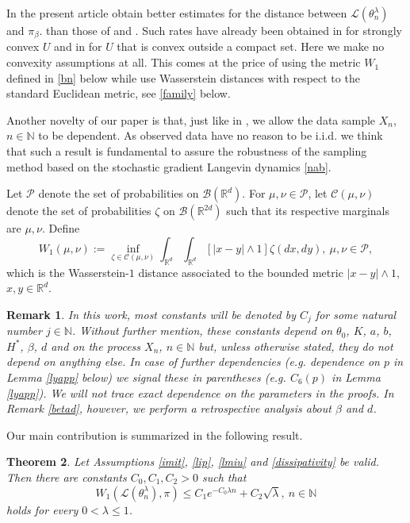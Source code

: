 \documentclass[a4paper,draft]{article}
\newtheorem{theorem}{Theorem}[section]
\newtheorem{remark}[theorem]{Remark}
\begin{document}
In the present article obtain better estimates for 
the distance between $\mathcal{L}(\theta^{\lambda}_n)$ and $\pi_{\beta}$.
than those of \cite{raginsky} and
\cite{xu}. Such rates have already been obtained in \cite{convex}
for strongly convex $U$ and in \cite{alex} for $U$ that is convex outside
a compact set. Here we make no convexity assumptions at all. 
This comes at the price of using the metric $W_1$ defined in \eqref{bn} below while 
\cite{raginsky,xu,alex,convex} use Wasserstein distances with respect to the
standard Euclidean metric, see \eqref{family} below. 

Another novelty of our paper is that, just like in \cite{convex},
we allow the data sample $X_n$, $n\in\mathbb{N}$ to be dependent. As observed data have no reason
to be i.i.d. we think that such a result is
fundamental to assure the robustness of the sampling method based on the stochastic
gradient Langevin dynamics \eqref{nab}.

Let $\mathcal{P}$ denote the set of probabilities on $\mathcal{B}(\mathbb{R}^d)$.
For $\mu,\nu\in\mathcal{P}$,
let $\mathcal{C}(\mu,\nu)$ denote the set of probabilities $\zeta$
on $\mathcal{B}(\mathbb{R}^{2d})$ such that its respective marginals are $\mu,\nu$. Define
\begin{equation}\label{bn}
W_1(\mu,\nu):=\inf_{\zeta\in\mathcal{C}(\mu,\nu)}\int_{\mathbb{R}^d}\int_{\mathbb{R}^d} [|x-y|\wedge 1]\zeta(dx,dy),\ \mu,\nu\in\mathcal{P},
\end{equation}
which is the Wasserstein-$1$ distance associated to the bounded metric $|x-y|\wedge 1$,
$x,y\in\mathbb{R}^d$.

\begin{remark} {\rm In this work, most constants will be denoted by $C_j$ for some natural number 
$j\in\mathbb{N}$.
Without further mention, these constants depend on $\theta_0$, $K$, $a$, $b$,
$H^*$, $\beta$, $d$ and on the process $X_n$, $n\in\mathbb{N}$ but, unless otherwise stated,
they do not depend on anything else. In case of further dependencies (e.g. dependence on $p$
in Lemma \ref{lyapp} below) we signal these in parentheses (e.g. $C_6(p)$ in Lemma
\ref{lyapp}). We will not trace exact dependence on the parameters in the proofs. In Remark \ref{betad},
however, we perform a retrospective analysis about $\beta$ and $d$.}
\end{remark}

Our main contribution is summarized in the
following result.

\begin{theorem}\label{main} Let Assumptions \ref{imit}, \ref{lip}, \ref{lmiu} and \ref{dissipativity}
be valid. Then there are constants
$C_0,C_1,C_2>0$ such that
\begin{equation}\label{manyi}
W_1(\mathcal{L}(\theta^{\lambda}_n),\pi)\leq C_1 e^{-C_0\lambda n}+C_2\sqrt{\lambda}
,\ n\in\mathbb{N}
\end{equation}
holds for every $0<\lambda\leq 1$.
\end{theorem}
\end{document}

